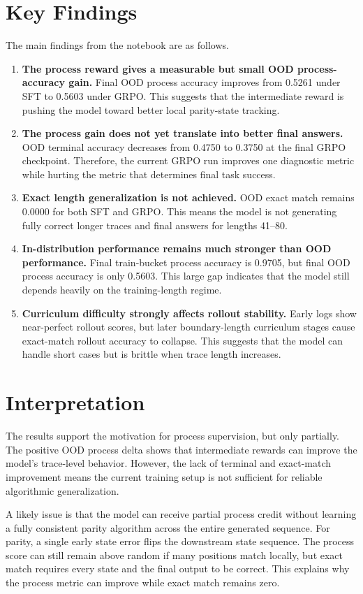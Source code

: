 \documentclass[11pt]{article}
\begin{document}
\section{Key Findings}
The main findings from the notebook are as follows.
\begin{enumerate}[leftmargin=*]
  \item \textbf{The process reward gives a measurable but small OOD process-accuracy gain.} Final OOD process accuracy improves from 0.5261 under SFT to 0.5603 under GRPO. This suggests that the intermediate reward is pushing the model toward better local parity-state tracking.
  \item \textbf{The process gain does not yet translate into better final answers.} OOD terminal accuracy decreases from 0.4750 to 0.3750 at the final GRPO checkpoint. Therefore, the current GRPO run improves one diagnostic metric while hurting the metric that determines final task success.
  \item \textbf{Exact length generalization is not achieved.} OOD exact match remains 0.0000 for both SFT and GRPO. This means the model is not generating fully correct longer traces and final answers for lengths 41--80.
  \item \textbf{In-distribution performance remains much stronger than OOD performance.} Final train-bucket process accuracy is 0.9705, but final OOD process accuracy is only 0.5603. This large gap indicates that the model still depends heavily on the training-length regime.
  \item \textbf{Curriculum difficulty strongly affects rollout stability.} Early logs show near-perfect rollout scores, but later boundary-length curriculum stages cause exact-match rollout accuracy to collapse. This suggests that the model can handle short cases but is brittle when trace length increases.
\end{enumerate}

\section{Interpretation}
The results support the motivation for process supervision, but only partially. The positive OOD process delta shows that intermediate rewards can improve the model's trace-level behavior. However, the lack of terminal and exact-match improvement means the current training setup is not sufficient for reliable algorithmic generalization.

A likely issue is that the model can receive partial process credit without learning a fully consistent parity algorithm across the entire generated sequence. For parity, a single early state error flips the downstream state sequence. The process score can still remain above random if many positions match locally, but exact match requires every state and the final output to be correct. This explains why the process metric can improve while exact match remains zero.
\end{document}
